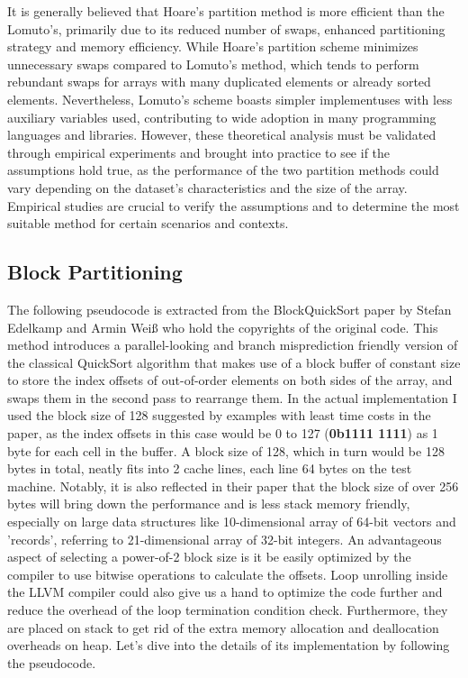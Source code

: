 \documentclass{article}
\begin{document}
It is generally believed that Hoare's partition method is more efficient than the Lomuto's, primarily due to its reduced number of swaps, enhanced partitioning strategy and memory efficiency.
While Hoare's partition scheme minimizes unnecessary swaps compared to Lomuto's method, which tends to perform rebundant swaps for arrays with many duplicated elements or already sorted elements.
Nevertheless, Lomuto's scheme boasts simpler implementuses with less auxiliary variables used, contributing to wide adoption in many programming languages and libraries.
However, these theoretical analysis must be validated through empirical experiments and brought into practice to see if the assumptions hold true, as the performance of the two partition methods could vary depending on the dataset's characteristics and the size of the array.
Empirical studies are crucial to verify the assumptions and to determine the most suitable method for certain scenarios and contexts.

\subsection{Block Partitioning}
The following pseudocode is extracted from the BlockQuickSort paper by Stefan Edelkamp and Armin Weiß \cite{BlockQuickSort} who hold the copyrights of the original code.
This method introduces a parallel-looking and branch misprediction friendly version of the classical QuickSort algorithm that makes use of a block buffer of constant size to store the index offsets of out-of-order elements on both sides of the array, and swaps them in the second pass to rearrange them.
In the actual implementation I used the block size of 128 suggested by examples with least time costs in the paper, as the index offsets in this case would be 0 to 127 (\textbf{0b1111 1111}) as 1 byte for each cell in the buffer.
A block size of 128, which in turn would be 128 bytes in total, neatly fits into 2 cache lines, each line 64 bytes on the test machine.
Notably, it is also reflected in their paper that the block size of over 256 bytes will bring down the performance and is less stack memory friendly, especially on large data structures like 10-dimensional array of 64-bit vectors and 'records', referring to 21-dimensional array of 32-bit integers.
An advantageous aspect of selecting a power-of-2 block size is it be easily optimized by the compiler to use bitwise operations to calculate the offsets. Loop unrolling inside the LLVM compiler could also give us a hand to optimize the code further and reduce the overhead of the loop termination condition check.
Furthermore, they are placed on stack to get rid of the extra memory allocation and deallocation overheads on heap. Let's dive into the details of its implementation by following the pseudocode.
\end{document}
